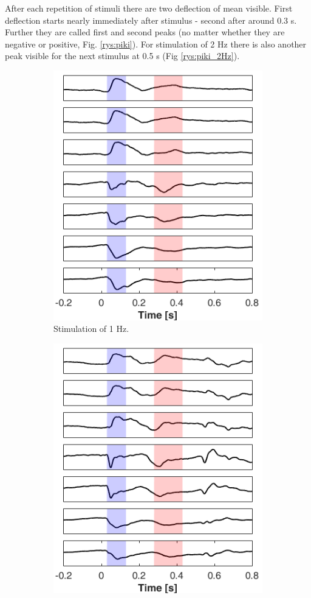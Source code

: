\documentclass{pracalicmgr}
\begin{document}
	After each repetition of stimuli there are two deflection of mean visible. First deflection starts nearly immediately after stimulus - second after around 0.3 s.  Further they are called first and second peaks (no matter whether they are negative or positive, Fig. \ref{rys:piki}). For stimulation of 2 Hz there is also another peak visible for the next stimulus at 0.5 s (Fig \ref{rys:piki_2Hz}). 
	
	\begin{figure}[H]
		
	\begin{subfigure}{.5\textwidth}
	\centering
	\includegraphics[width=0.8\linewidth]{wybieranie_1Hz.png}
	\caption{Stimulation of 1 Hz.}
	\label{rys:piki_1Hz}
	\end{subfigure}
	\begin{subfigure}{.5\textwidth}
	\centering
	\includegraphics[width=0.8\linewidth]{wybieranie_2Hz.png}

\end{subfigure}
\end{figure}
\end{document}
